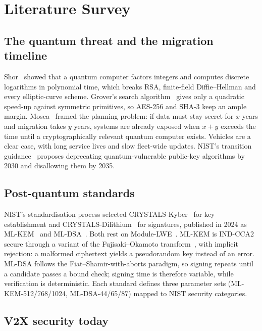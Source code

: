 \chapter{Literature Survey}
\label{ch:lit}

\section{The quantum threat and the migration timeline}

Shor~\cite{shor} showed that a quantum computer factors integers and computes
discrete logarithms in polynomial time, which breaks RSA, finite-field
Diffie--Hellman and every elliptic-curve scheme. Grover's search
algorithm~\cite{grover} gives only a quadratic speed-up against symmetric
primitives, so AES-256 and SHA-3 keep an ample margin. Mosca~\cite{mosca}
framed the planning problem: if data must stay secret for $x$ years and
migration takes $y$ years, systems are already exposed when $x + y$ exceeds
the time until a cryptographically relevant quantum computer exists. Vehicles
are a clear case, with long service lives and slow fleet-wide updates. NIST's
transition guidance~\cite{nistir8547} proposes deprecating quantum-vulnerable
public-key algorithms by 2030 and disallowing them by 2035.

\section{Post-quantum standards}

NIST's standardisation process selected CRYSTALS-Kyber~\cite{kyber} for key
establishment and CRYSTALS-Dilithium~\cite{dilithium} for signatures, published
in 2024 as ML-KEM~\cite{fips203} and ML-DSA~\cite{fips204}. Both rest on
Module-LWE~\cite{regev,langlois}. ML-KEM is IND-CCA2 secure through a variant
of the Fujisaki--Okamoto transform~\cite{fo}, with implicit rejection: a
malformed ciphertext yields a pseudorandom key instead of an error. ML-DSA
follows the Fiat--Shamir-with-aborts paradigm, so signing repeats until a
candidate passes a bound check; signing time is therefore variable, while
verification is deterministic. Each standard defines three parameter sets
(ML-KEM-512/768/1024, ML-DSA-44/65/87) mapped to NIST security categories.

\section{V2X security today}

